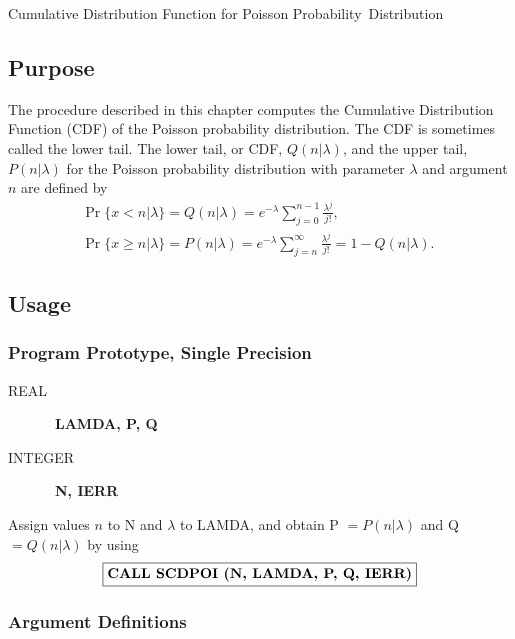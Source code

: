 \documentclass[twoside]{MATH77}
\begin{document}
 Cumulative Distribution Function for Poisson
\hbox{Probability Distribution}


\subsection{Purpose}

The procedure described in this chapter computes the Cumulative Distribution
Function (CDF) of the Poisson probability distribution. The CDF is sometimes
called the lower tail. The lower tail,
or CDF, $Q(n|\lambda )$, and the upper tail, $P(n|\lambda )$ for the Poisson
probability distribution with parameter $\lambda $ and argument $n$ are
defined by%
\begin{gather*}
\Pr \{x<n|\lambda \}=Q(n|\lambda )=e^{-\lambda }\sum_{j=0}^{
n-1}\frac{\lambda ^j}{j!},\phantom{=1-Q(n|\lambda )}\\
\Pr \{x\geq n|\lambda \}=P(n|\lambda )=e^{-\lambda }
\sum_{j=n}^\infty \frac{\lambda ^j}{j!}=1-Q(n|\lambda ).
\end{gather*}
\subsection{Usage}

\subsubsection{Program Prototype, Single Precision}

\begin{description}
\item[REAL]  \ {\bf LAMDA, P, Q}

\item[INTEGER]  \ {\bf N, IERR}
\end{description}

Assign values $n$ to N and $\lambda $ to LAMDA, and obtain P $= P(n|\lambda
) $ and Q $= Q(n|\lambda )$ by using
$$
\fbox{{\bf CALL SCDPOI (N, LAMDA, P, Q, IERR)}}
$$

\subsubsection{Argument Definitions}
\end{document}
